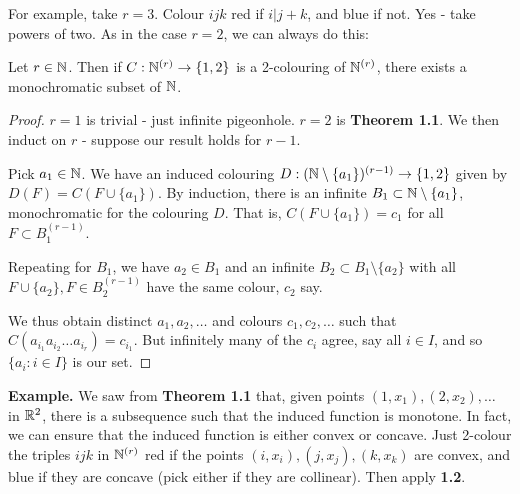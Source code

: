 \documentclass[10pt,a4paper]{article}
\begin{document}
For example, take $r = 3$. Colour $ijk$ red if $i|j+k$, and blue if not. Yes - take powers of two. As in the case $r = 2$, we can always do this:
\begin{theorem}
  Let $r \in \mathbb{N}$. Then if $C:\mathbb{N}^{(r)} \to \{1,2\}$ is a 2-colouring of $\mathbb{N}^{(r)}$, there exists a monochromatic subset of $\mathbb{N}$.
\end{theorem}
\begin{proof}
  $r = 1$ is trivial - just infinite pigeonhole. $r = 2$ is \textbf{Theorem 1.1}. We then induct on $r$ - suppose our result holds for $r - 1$.

  Pick $a_1 \in \mathbb{N}$. We have an induced colouring $D:(\mathbb{N}\setminus\{a_1\})^{(r-1)} \to \{1,2\}$ given by $D(F) = C(F\cup\{a_1\})$. By induction, there is an infinite $B_1 \subset \mathbb{N}\setminus \{a_1\}$, monochromatic for the colouring $D$. That is, $C(F\cup\{a_1\}) = c_1$ for all $F \subset B_1^{(r-1)}$.

  Repeating for $B_1$, we have $a_2 \in B_1$ and an infinite $B_2 \subset B_1 \setminus \{a_2\}$ with all $F\cup\{a_2\}, F \in B_2^{(r-1)}$ have the same colour, $c_2$ say.

  We thus obtain distinct $a_1, a_2, \ldots$ and colours $c_1, c_2, \ldots$ such that $C(a_{i_1}a_{i_2}\ldots a_{i_r}) = c_{i_1}$. But infinitely many of the $c_i$ agree, say all $i \in I$, and so $\{a_i:i \in I\}$ is our set.
\end{proof}
\textbf{Example.} We saw from \textbf{Theorem 1.1} that, given points $(1, x_1), (2,x_2), \ldots$ in $\mathbb{R}^2$, there is a subsequence such that the induced function is monotone. In fact, we can ensure that the induced function is either convex or concave. Just 2-colour the triples $ijk$ in $\mathbb{N}^{(r)}$ red if the points $(i,x_i), (j, x_j), (k, x_k)$ are convex, and blue if they are concave (pick either if they are collinear). Then apply \textbf{1.2}.
\end{document}
